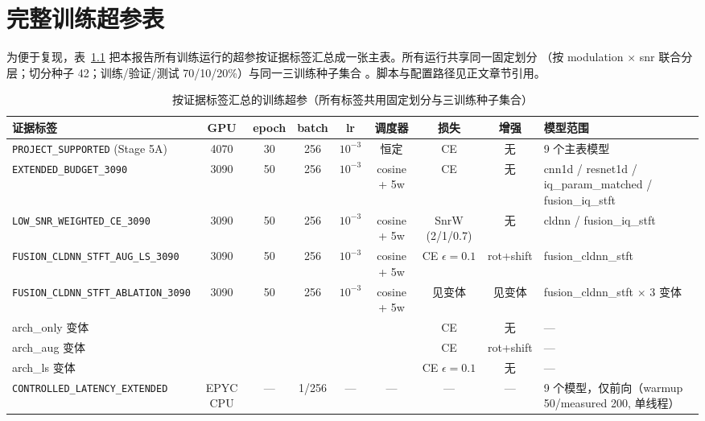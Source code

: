 \chapter{完整训练超参表}
\label{appendix:hyperparameters}

为便于复现，表~\ref{tab:hyperparameters-by-evidence} 把本报告所有训练运行的超参按证据标签汇总成一张主表。所有运行共享同一固定划分 \splitname{}（按 modulation \(\times\) snr 联合分层；切分种子 42；训练/验证/测试 70/10/20\%）与同一三训练种子集合 \mainseeds{}。脚本与配置路径见正文章节引用。

\begin{table}[htbp]
  \centering
  \caption{按证据标签汇总的训练超参（所有标签共用固定划分与三训练种子集合）}
  \label{tab:hyperparameters-by-evidence}
  \scriptsize
  \setlength{\tabcolsep}{3pt}
  \begin{tabularx}{\textwidth}{lcccccccX}
    \toprule
    证据标签 & GPU & epoch & batch & lr & 调度器 & 损失 & 增强 & 模型范围 \\
    \midrule
    \texttt{PROJECT\_SUPPORTED} (Stage 5A) & 4070 & 30 & 256 & \(10^{-3}\) & 恒定 & CE & 无 & 9 个主表模型 \\
    \texttt{EXTENDED\_BUDGET\_3090} & 3090 & 50 & 256 & \(10^{-3}\) & cosine + 5w & CE & 无 & cnn1d / resnet1d / iq\_param\_matched / fusion\_iq\_stft \\
    \texttt{LOW\_SNR\_WEIGHTED\_CE\_3090} & 3090 & 50 & 256 & \(10^{-3}\) & cosine + 5w & SnrW (2/1/0.7) & 无 & cldnn / fusion\_iq\_stft \\
    \texttt{FUSION\_CLDNN\_STFT\_AUG\_LS\_3090} & 3090 & 50 & 256 & \(10^{-3}\) & cosine + 5w & CE \(\epsilon=0.1\) & rot+shift & fusion\_cldnn\_stft \\
    \texttt{FUSION\_CLDNN\_STFT\_ABLATION\_3090} & 3090 & 50 & 256 & \(10^{-3}\) & cosine + 5w & 见变体 & 见变体 & fusion\_cldnn\_stft \(\times\) 3 变体 \\
    \quad arch\_only 变体 & & & & & & CE & 无 & — \\
    \quad arch\_aug 变体 & & & & & & CE & rot+shift & — \\
    \quad arch\_ls 变体 & & & & & & CE \(\epsilon=0.1\) & 无 & — \\
    \texttt{CONTROLLED\_LATENCY\_EXTENDED} & EPYC CPU & — & 1/256 & — & — & — & — & 9 个模型，仅前向（warmup 50/measured 200, 单线程）\\
    \bottomrule
  \end{tabularx}
\end{table}

